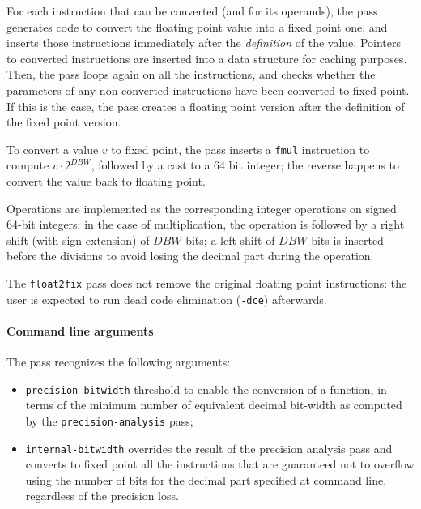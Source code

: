 \documentclass[9pt,twocolumn,a4paper]{scrartcl}
\begin{document}
For each instruction that can be converted (and for its operands), the pass
generates code to convert the floating point value into a fixed point one, and
inserts those instructions immediately after the \emph{definition} of the
value. Pointers to converted instructions are inserted into a data structure
for caching purposes. Then, the pass loops again on all the instructions, and
checks whether the parameters of any non-converted instructions have been
converted to fixed point. If this is the case, the pass creates a floating
point version after the definition of the fixed point version.

To convert a value $v$ to fixed point, the pass inserts a \verb|fmul|
instruction to compute $v \cdot 2^{DBW}$, followed by a cast to a 64 bit
integer; the reverse happens to convert the value back to floating point.

Operations are implemented as the corresponding integer operations on signed
64-bit integers; in the case of multiplication, the operation is followed by a
right shift (with sign extension) of $DBW$ bits; a left shift of $DBW$ bits is
inserted before the divisions to avoid losing the decimal part during the
operation.

The \verb|float2fix| pass does not remove the original floating point
instructions: the user is expected to run dead code elimination (\verb|-dce|)
afterwards.

\paragraph{Command line arguments} The pass recognizes the following arguments:
\begin{itemize}
\item \verb|precision-bitwidth| threshold to enable the conversion of a
function, in terms of the minimum number of equivalent decimal bit-width as
computed by the \verb|precision-analysis| pass;
\item \verb|internal-bitwidth| overrides the result of the precision analysis
pass and converts to fixed point all the instructions that are guaranteed not
to overflow using the number of bits for the decimal part specified at command
line, regardless of the precision loss.
\end{itemize}
\end{document}
